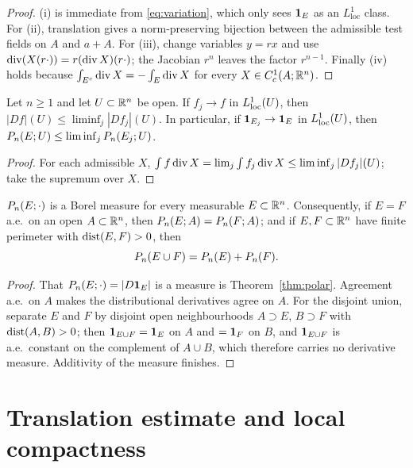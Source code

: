\begin{proof}
(i) is immediate from \eqref{eq:variation}, which only sees $\mathbf 1_{E}$ as an
$L^1_{\mathrm{loc}}$ class.  For (ii), translation gives a norm-preserving
bijection between the admissible test fields on $A$ and $a+A$.  For (iii),
change variables $y=rx$ and use
$\operatorname{div}(X(r\cdot))=r(\operatorname{div} X)(r\cdot)$; the Jacobian $r^n$ leaves the factor
$r^{n-1}$.  Finally (iv) holds because
$\int_{E^c}\operatorname{div} X=-\int_E\operatorname{div} X$ for every $X\in C^1_c(A;\mathbb R^n)$.
\end{proof}

\begin{lemma}\label{lem:lsc}
Let $n\ge1$ and let $U\subset\mathbb R^n$ be open.  If $f_j\to f$ in
$L^1_{\mathrm{loc}}(U)$, then
$|Df|(U)\le\liminf_j|Df_j|(U)$.  In particular, if
$\mathbf 1_{E_j}\to\mathbf 1_{E}$ in $L^1_{\mathrm{loc}}(U)$, then
$P_n(E;U)\le\liminf_jP_n(E_j;U)$.
\end{lemma}

\begin{proof}
For each admissible $X$, $\int f\operatorname{div} X=\lim_j\int f_j\operatorname{div} X\le\liminf_j|Df_j|(U)$;
take the supremum over $X$.
\end{proof}

\begin{lemma}\label{lem:locality}
$P_n(E;\cdot)$ is a Borel measure for every measurable $E\subset\mathbb R^n$.
Consequently, if $E=F$ a.e.\ on an open $A\subset\mathbb R^n$, then
$P_n(E;A)=P_n(F;A)$; and if $E,F\subset\mathbb R^n$ have finite perimeter
with $\operatorname{dist}(E,F)>0$, then
\[
  P_n(E\cup F)=P_n(E)+P_n(F).
\]
\end{lemma}

\begin{proof}
That $P_n(E;\cdot)=|D\mathbf 1_{E}|$ is a measure is
Theorem~\ref{thm:polar}.  Agreement a.e.\ on $A$ makes the distributional
derivatives agree on $A$.  For the disjoint union, separate $E$ and $F$ by
disjoint open neighbourhoods $A\supset E$, $B\supset F$ with
$\operatorname{dist}(A,B)>0$; then $\mathbf 1_{E\cup F}=\mathbf 1_{E}$ on $A$ and $=\mathbf 1_{F}$ on $B$, and
$\mathbf 1_{E\cup F}$ is a.e.\ constant on the complement of $A\cup B$, which
therefore carries no derivative measure.  Additivity of the measure finishes.
\end{proof}

\section{Translation estimate and local compactness}

